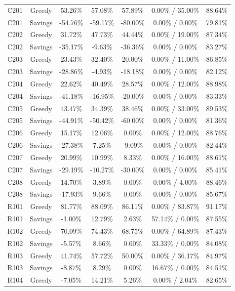 \documentclass[conference]{IEEEtran}
\begin{document}
\begin{table}[htbp]
{\begin{tabular}{lcccccc}
C201 & Greedy & 53.26\% & 57.08\% & 57.89\% & 0.00\% / 35.00\% & 88.64\% \\
C201 & Savings & -54.76\% & -59.17\% & -80.00\% & 0.00\% / 0.00\% & 79.81\% \\
C202 & Greedy & 31.72\% & 47.73\% & 44.44\% & 0.00\% / 19.00\% & 87.34\% \\
C202 & Savings & -35.17\% & -9.63\% & -36.36\% & 0.00\% / 0.00\% & 83.27\% \\
C203 & Greedy & 23.43\% & 32.40\% & 20.00\% & 0.00\% / 11.00\% & 86.85\% \\
C203 & Savings & -28.86\% & -4.93\% & -18.18\% & 0.00\% / 0.00\% & 82.12\% \\
C204 & Greedy & 22.62\% & 40.49\% & 28.57\% & 0.00\% / 12.00\% & 88.98\% \\
C204 & Savings & -41.18\% & -16.95\% & -20.00\% & 0.00\% / 0.00\% & 83.33\% \\
C205 & Greedy & 43.47\% & 34.39\% & 38.46\% & 0.00\% / 33.00\% & 89.53\% \\
C205 & Savings & -44.91\% & -50.42\% & -60.00\% & 0.00\% / 0.00\% & 81.36\% \\
C206 & Greedy & 15.17\% & 12.06\% & 0.00\% & 0.00\% / 12.00\% & 88.76\% \\
C206 & Savings & -27.38\% & 7.25\% & -9.09\% & 0.00\% / 0.00\% & 82.44\% \\
C207 & Greedy & 20.99\% & 10.99\% & 8.33\% & 0.00\% / 16.00\% & 88.61\% \\
C207 & Savings & -29.19\% & -10.27\% & -30.00\% & 0.00\% / 0.00\% & 85.41\% \\
C208 & Greedy & 14.70\% & 3.89\% & 0.00\% & 0.00\% / 4.00\% & 88.46\% \\
C208 & Savings & -17.93\% & 9.66\% & 0.00\% & 0.00\% / 0.00\% & 85.67\% \\
R101 & Greedy & 81.77\% & 88.09\% & 86.11\% & 0.00\% / 83.87\% & 91.17\% \\
R101 & Savings & -1.00\% & 12.79\% & 2.63\% & 57.14\% / 0.00\% & 87.55\% \\
R102 & Greedy & 70.09\% & 74.43\% & 68.75\% & 0.00\% / 64.89\% & 87.43\% \\
R102 & Savings & -5.57\% & 8.66\% & 0.00\% & 33.33\% / 0.00\% & 84.08\% \\
R103 & Greedy & 41.74\% & 57.72\% & 50.00\% & 0.00\% / 36.17\% & 84.97\% \\
R103 & Savings & -8.87\% & 8.29\% & 0.00\% & 16.67\% / 0.00\% & 84.51\% \\
R104 & Greedy & -7.05\% & 14.21\% & 5.26\% & 0.00\% / 2.04\% & 82.65\% \\

\end{tabular}}
\end{table}
\end{document}
